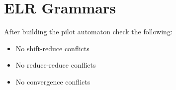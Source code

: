 \section{ELR Grammars}
After building the pilot automaton check the following:
\begin{itemize}
    \item No shift-reduce conflicts
    \item No reduce-reduce conflicts
    \item No convergence conflicts
\end{itemize}

